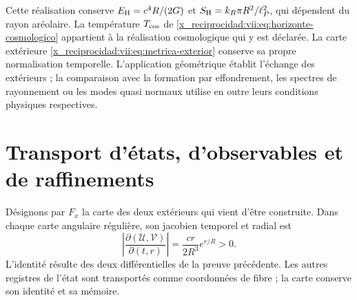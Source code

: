 Cette réalisation conserve
\(E_{\rm H}=c^4R/(2G)\) et
\(S_{\rm H}=k_B\pi R^2/\ell_P^2\), qui dépendent du rayon aréolaire.
La température \(T_{\rm cos}\) de
\eqref{x_reciprocidad:vii:eq:horizonte-cosmologico} appartient à la réalisation
cosmologique qui y est déclarée. La carte extérieure
\eqref{x_reciprocidad:vii:eq:metrica-exterior} conserve sa propre normalisation temporelle.
L'application géométrique établit l'échange des extérieurs ; la comparaison
avec la formation par effondrement, les spectres de rayonnement ou les modes quasi normaux
utilise en outre leurs conditions physiques respectives.

\section{Transport d'états, d'observables et de raffinements}
\label{x_reciprocidad:vii:subsec:transporte-informacion-horizonte}

Désignons par \(F_x\) la carte des deux extérieurs qui vient d'être construite. Dans chaque carte angulaire régulière, son jacobien temporel et radial est
\begin{equation}
 \left|\frac{\partial(\mathcal U,\mathcal V)}{\partial(t,r)}\right|
 =\frac{cr}{2R^3}e^{r/R}>0.
 \label{x_reciprocidad:vii:eq:jacobiano-kruskal}
\end{equation}
L'identité résulte des deux différentielles de la preuve précédente.
Les autres registres de l'état sont transportés comme coordonnées de
fibre ; la carte conserve son identité et sa mémoire.

